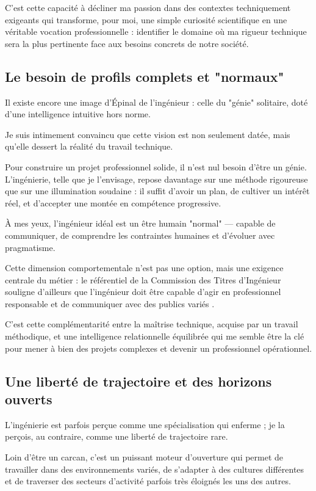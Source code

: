 C'est cette capacité à décliner ma passion dans des contextes techniquement exigeants 
qui transforme, pour moi, une simple curiosité scientifique en une véritable vocation professionnelle : 
identifier le domaine où ma rigueur technique sera la plus pertinente 
face aux besoins concrets de notre société.

\subsection{Le besoin de profils complets et "normaux"}

Il existe encore une image d’Épinal de l'ingénieur : 
celle du "génie" solitaire, doté d'une intelligence intuitive hors norme. 

Je suis intimement convaincu que cette vision est non seulement datée, 
mais qu'elle dessert la réalité du travail technique. 

Pour construire un projet professionnel solide, 
il n'est nul besoin d'être un génie. 
L'ingénierie, telle que je l'envisage, repose davantage sur une méthode rigoureuse 
que sur une illumination soudaine : 
il suffit d'avoir un plan, de cultiver un intérêt réel, et d'accepter une montée en compétence progressive. 

À mes yeux, 
l'ingénieur idéal est un être humain "normal" — 
capable de communiquer, de comprendre les contraintes humaines et d'évoluer avec pragmatisme. 

Cette dimension comportementale n'est pas une option, 
mais une exigence centrale du métier : 
le référentiel de la Commission des Titres d'Ingénieur souligne d'ailleurs que l'ingénieur 
doit être capable d'agir en professionnel responsable et de communiquer avec des publics variés \cite{cti_competences}. 

C'est cette complémentarité entre la maîtrise technique, acquise par un travail méthodique, 
et une intelligence relationnelle équilibrée qui me semble être la clé 
pour mener à bien des projets complexes et devenir un professionnel opérationnel.

\subsection{Une liberté de trajectoire et des horizons ouverts}

L'ingénierie est parfois perçue comme une spécialisation qui enferme ; 
je la perçois, au contraire, comme une liberté de trajectoire rare. 

Loin d'être un carcan, 
c'est un puissant moteur d'ouverture qui permet de travailler dans des environnements variés, 
de s'adapter à des cultures différentes 
et de traverser des secteurs d'activité parfois très éloignés les uns des autres. 

